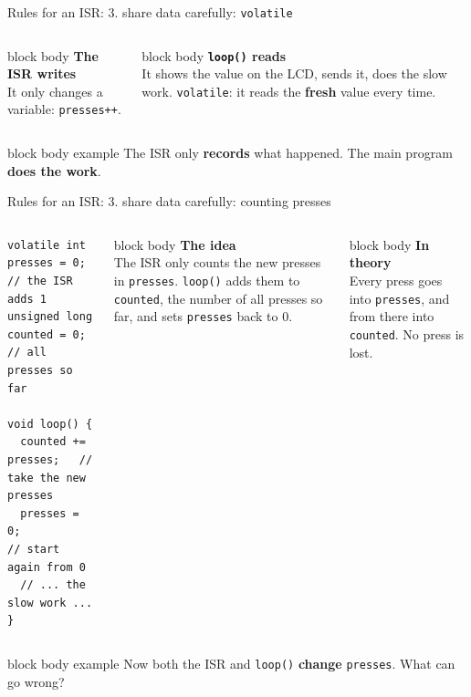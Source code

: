 \documentclass[aspectratio=169,10pt]{beamer}
\newcommand{\stepbox}[2]{%
  \begin{beamercolorbox}[rounded=true,sep=0.09cm,wd=\linewidth]{block body}
    \footnotesize\textbf{#1}\\ #2
  \end{beamercolorbox}\vspace{0.06cm}}
\newcommand{\keymsg}[1]{%
  \begin{beamercolorbox}[rounded=true,sep=0.1cm,wd=\textwidth]{block body example}
    \centering\footnotesize #1
  \end{beamercolorbox}}
\begin{document}
\begin{frame}{Rules for an ISR: 3. share data carefully: \texttt{volatile}}
  \vfill
  \begin{center}
  \end{center}
  \vspace{0.2cm}
  \begin{columns}[T,onlytextwidth]
      \stepbox{The ISR writes}{It only changes a variable: \texttt{presses++}.}
      \stepbox{\texttt{loop()} reads}{It shows the value on the LCD, sends it, does the slow work.
        \texttt{volatile}: it reads the \textbf{fresh} value every time.}
  \end{columns}
  \vfill
  \keymsg{The ISR only \textbf{records} what happened. The main program \textbf{does the work}.}
\end{frame}

\begin{frame}[fragile]{Rules for an ISR: 3. share data carefully: counting presses}
  \vfill
  \begin{columns}[c,onlytextwidth]
\begin{lstlisting}[style=rtos]
volatile int presses = 0;   // the ISR adds 1
unsigned long counted = 0;  // all presses so far

void loop() {
  counted += presses;   // take the new presses
  presses = 0;          // start again from 0
  // ... the slow work ...
}
\end{lstlisting}
      \stepbox{The idea}{The ISR only counts the new presses in \texttt{presses}. \texttt{loop()} adds them to
        \texttt{counted}, the number of all presses so far, and sets \texttt{presses} back to 0.}
      \stepbox{In theory}{Every press goes into \texttt{presses}, and from there into \texttt{counted}.
        No press is lost.}
  \end{columns}
  \vfill
  \keymsg{Now both the ISR and \texttt{loop()} \textbf{change} \texttt{presses}. What can go wrong?}
\end{frame}
\end{document}
